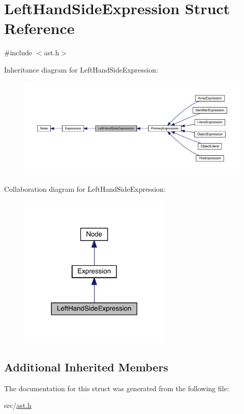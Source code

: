 \hypertarget{struct_left_hand_side_expression}{}\section{Left\+Hand\+Side\+Expression Struct Reference}
\label{struct_left_hand_side_expression}


{\ttfamily \#include $<$ast.\+h$>$}



Inheritance diagram for Left\+Hand\+Side\+Expression\+:
\nopagebreak
\begin{figure}[H]
\begin{center}
\leavevmode
\includegraphics[width=350pt]{struct_left_hand_side_expression__inherit__graph}
\end{center}
\end{figure}


Collaboration diagram for Left\+Hand\+Side\+Expression\+:
\nopagebreak
\begin{figure}[H]
\begin{center}
\leavevmode
\includegraphics[width=206pt]{struct_left_hand_side_expression__coll__graph}
\end{center}
\end{figure}
\subsection*{Additional Inherited Members}


The documentation for this struct was generated from the following file\+:\begin{DoxyCompactItemize}
\item 
src/\hyperlink{ast_8h}{ast.\+h}\end{DoxyCompactItemize}
